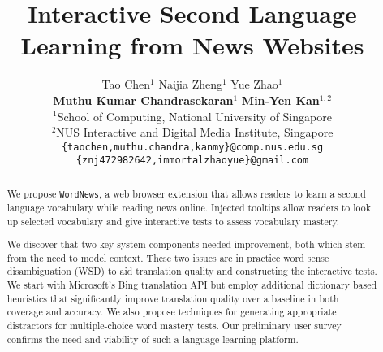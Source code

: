 \documentclass[11pt]{article}
\title{Interactive Second Language Learning from News Websites}
\author{
  	Tao Chen$^{1}$\qquad 
  	Naijia Zheng$^{1}$\qquad
  	Yue Zhao$^{1}$ \\
  	{\bf Muthu Kumar Chandrasekaran$^{1}$}\qquad 
  	{\bf Min-Yen Kan$^{1,2}$}\\ 
  	$^{1}$School of Computing, National University of Singapore\\
  	$^{2}$NUS Interactive and Digital Media Institute, Singapore\\
  	{\tt \{taochen,muthu.chandra,kanmy\}@comp.nus.edu.sg}  \\ 
  	{\tt \{znj472982642,immortalzhaoyue\}@gmail.com}}
\date{}
\begin{document}
\maketitle
\begin{abstract}


We propose {\tt WordNews}, a web browser extension that allows readers to learn a
second language vocabulary while reading news online.  Injected
tooltips allow readers to look up selected vocabulary and give
interactive tests to assess vocabulary mastery.  

We discover that two key system components needed improvement, both
which stem from the need to model context.  These two issues are in
practice word sense disambiguation (WSD) to aid translation quality
and constructing the interactive tests. We start with Microsoft's Bing
translation API but employ additional dictionary based heuristics that
significantly improve translation quality over a baseline in both
coverage and accuracy. We also propose techniques for generating
appropriate distractors for multiple-choice word mastery tests.  Our
preliminary user survey confirms the need and viability of such a
language learning platform.

\end{abstract}









%
%



\end{document}
